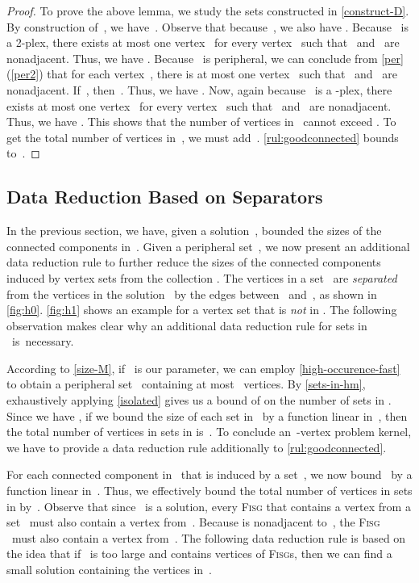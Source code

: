 \documentclass[12pt, a4paper, abstracton]{scrreprt}
\newcommand{\pl}[1]{\mbox{-plex}}
\newcommand{\FISG}{\textsc{Fisg}}
\theoremstyle{definition}
\theoremstyle{remark}
\begin{document}
\begin{proof}
  To prove the above lemma, we study the sets constructed in \autoref{construct-D}. By construction of~, we have~. Observe that because~, we also have . Because ~is a 2-plex, there exists at most one vertex~ for every vertex~ such that ~and~ are nonadjacent. Thus, we have . Because~ is peripheral, we can conclude from \autoref{per}(\ref{per2}) that for each vertex~, there is at most one vertex~ such that~ and~ are nonadjacent. If~, then~.  Thus, we have . Now, again because~ is a \pl 2, there exists at most one vertex~ for every vertex~ such that~ and~ are nonadjacent.  Thus, we have .  This shows that the number of vertices in~ cannot exceed . To get the total number of vertices in~, we must add~. \autoref{rul:goodconnected} bounds~ to~.
\end{proof}

\subsection{Data Reduction Based on Separators}
\label{weak}
In the previous section, we have, given a solution~, bounded the sizes of the connected components in~. Given a peripheral set~, we now present an additional data reduction rule to further reduce the sizes of the connected components induced by vertex sets from the collection . The vertices in a set~ are \emph{separated} from the vertices in the solution~ by the edges between~ and~, as shown in \autoref{fig:h0}. \autoref{fig:h1} shows an example for a vertex set that is \emph{not} in .  The following observation makes clear why an additional data reduction rule for sets in ~is~necessary.

According to \autoref{size-M}, if~ is our parameter, we can employ \autoref{high-occurence-fast} to obtain a peripheral set~ containing at most~ vertices. By \autoref{sets-in-hm}, exhaustively applying \autoref{isolated} gives us a bound of  on the number of sets in . Since we have , if we bound the size of each set in~ by a function linear in~, then the total number of vertices in sets in  is~. To conclude an~-vertex problem kernel, we have to provide a data reduction rule additionally to \autoref{rul:goodconnected}.

For each connected component in~ that is induced by a set~, we now bound~ by a function linear in~. Thus, we effectively bound the total number of vertices in sets in  by~.  Observe that since~ is a solution, every \FISG{} that contains a vertex from a set~ must also contain a vertex from~. Because  is nonadjacent to~, the \FISG{} ~must also contain a vertex from~. The following data reduction rule is based on the idea that if~ is too large and contains vertices of \FISG{}s, then we can find a small solution containing the vertices in~.
\end{document}
